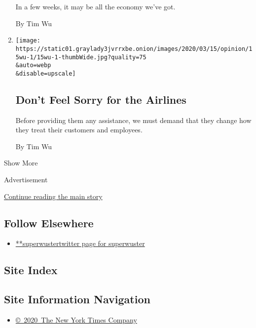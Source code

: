 \begin{enumerate}
  In a few weeks, it may be all the economy we've got.

  By Tim Wu
\item
  \href{/2020/03/16/opinion/airlines-bailout.html}{}

  \texttt{[image: https://static01.graylady3jvrrxbe.onion/images/2020/03/15/opinion/15wu-1/15wu-1-thumbWide.jpg?quality=75\\\&auto=webp\\\&disable=upscale]}

  \hypertarget{dont-feel-sorry-for-the-airlines}{%
  \subsection{Don't Feel Sorry for the
  Airlines}\label{dont-feel-sorry-for-the-airlines}}

  Before providing them any assistance, we must demand that they change
  how they treat their customers and employees.

  By Tim Wu
\end{enumerate}

Show More

Advertisement

\protect\hyperlink{after-mid2}{Continue reading the main story}

\hypertarget{follow-elsewhere}{%
\subsection{Follow Elsewhere}\label{follow-elsewhere}}

\begin{itemize}
\tightlist
\item
  \href{https://twitter.com/superwuster}{**superwustertwitter page for
  superwuster}
\end{itemize}

\hypertarget{site-index}{%
\subsection{Site Index}\label{site-index}}

\hypertarget{site-information-navigation}{%
\subsection{Site Information
Navigation}\label{site-information-navigation}}

\begin{itemize}
\tightlist
\item
  \href{https://help.nytimes3xbfgragh.onion/hc/en-us/articles/115014792127-Copyright-notice}{©~2020~The
  New York Times Company}
\end{itemize}

